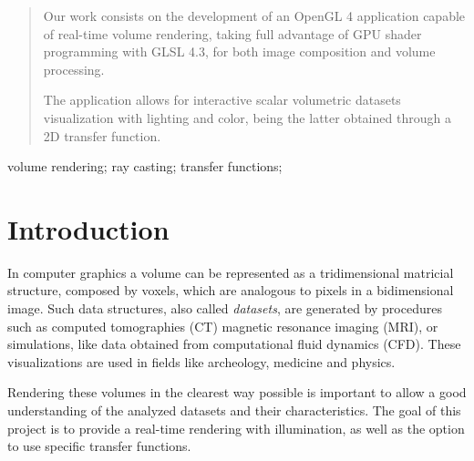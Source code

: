 \documentclass[10pt, conference]{IEEEtran}
\begin{document}
\maketitle


\begin{abstract}
Our work consists on the development of an OpenGL 4 application capable of real-time volume rendering, taking full advantage of GPU shader programming with GLSL 4.3, for both image composition and volume processing. 

The application allows for interactive scalar volumetric datasets visualization with lighting and color, being the latter obtained through a 2D transfer function.

%
\end{abstract}

\begin{IEEEkeywords}
volume rendering; ray casting; transfer functions;

\end{IEEEkeywords}


\IEEEpeerreviewmaketitle





\section{Introduction}
In computer graphics a volume can be represented as a tridimensional matricial structure, composed by voxels, which are analogous to pixels in a bidimensional image. Such data structures, also called \textit{datasets}, are generated by procedures such as computed tomographies (CT) magnetic resonance imaging (MRI), or simulations, like data obtained from computational fluid dynamics (CFD). These visualizations are used in fields like archeology, medicine and physics.


Rendering these volumes in the clearest way possible is important to allow a good understanding of the analyzed datasets and their characteristics. The goal of this project is to provide a real-time rendering with illumination, as well as the option to use specific transfer functions.
\end{document}
